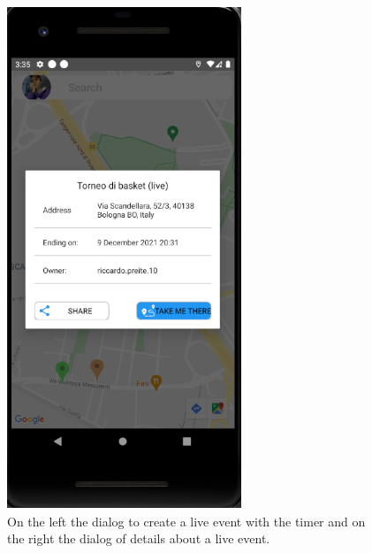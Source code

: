 \documentclass[../../main]{subfiles}
\begin{document}
\begin{figure}[H]
    \includegraphics[width=70mm,height=150mm]{images/app/live/live_map_detail.png}
    \caption{On the left the dialog to create a live event with the timer and on the right the dialog of details about a live event.}
\end{figure}
\end{document}
